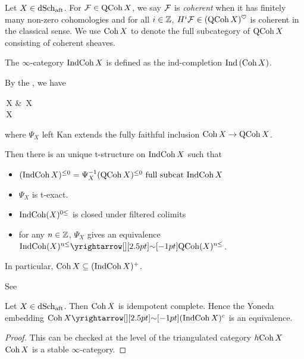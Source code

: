 \documentclass[./main.tex]{subfiles}
\begin{document}
  
\begin{dfn}[$\INDCOH$]
  
  Let $X \in \mathrm{dSch}_{\mathrm{aft}}$.
  For $\mathcal{F} \in \mathrm{QCoh}\,X$, 
  we say $\mathcal{F}$ is \emph{coherent} when
  it has finitely many non-zero cohomologies and for all $i \in \mathbb{Z}$, 
  $H^i \mathcal{F} \in (\mathrm{QCoh}\,X)^\heartsuit$ is coherent in the classical sense.
  We use $\mathrm{Coh}\,X$ to denote the full subcategory of $\mathrm{QCoh}\,X$
  consisting of coherent sheaves.
  \cite[Intro, 1.1.]{GR1}

  The $\infty$-category $\mathrm{IndCoh}\,X$ is defined as 
  the ind-completion $\mathrm{Ind}\,(\mathrm{Coh}\,X)$.
  \cite[Ch 4, 1.1.1]{GR1}
\end{dfn}

\begin{lem}
  
  By the ,
  we have \begin{cd}
    {\COH\,X} & {\QCOH\,X} \\
    {\INDCOH\,X}
    \arrow[from=1-1, to=2-1]
    \arrow[from=1-1, to=1-2]
    \arrow["{\Psi_X}"', dashed, from=2-1, to=1-2]
  \end{cd}
  where $\Psi_X$ left Kan extends the fully faithful inclusion
  $\mathrm{Coh}\,X \to \mathrm{QCoh}\,X$.
  
  Then there is an unique t-structure on $\mathrm{IndCoh}\, X$ such that 
  \begin{itemize}
    \item $(\mathrm{IndCoh}\,X)^{\leq 0} = 
    \Psi_X^{-1}(\mathrm{QCoh}\,X)^{\leq 0} \text{ full subcat } \mathrm{IndCoh}\,X$
    \item $\Psi_X$ is t-exact.
    \item $\mathrm{IndCoh}(X)^{0 \leq}$ is closed under filtered colimits
    \item for any $n \in \mathbb{Z}$, $\Psi_X$ gives an equivalence 
    $\INDCOH(X)^{n \leq} \map{\sim}{} \QCOH(X)^{n \leq}$.
  \end{itemize}

  In particular, $\mathrm{Coh}\,X \subseteq (\mathrm{IndCoh}\,X)^+$.
  \begin{proof1}
    See \cite[Ch 4, 1.2.2]{GR1}
  \end{proof1}
\end{lem}

\begin{prop}
  
  Let $X \in \mathrm{dSch}_{\mathrm{aft}}$.
  Then $\mathrm{Coh}\,X$ is idempotent complete.
  Hence the Yoneda embedding $\COH\,X \map{\sim}{} (\INDCOH\,X)^c$
  is an equivalence.

  \cite[Ch 4 , 1.2.8]{GR1}
\end{prop}
\begin{proof}
  This can be checked at the level of
  the triangulated category $h\mathrm{Coh}\,X$
   $\mathrm{Coh}\,X$ is a stable $\infty$-category.
\end{proof}
\end{document}
